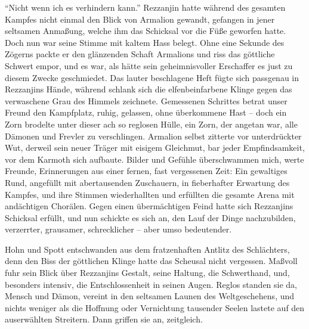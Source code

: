 ``Nicht wenn ich es verhindern kann.'' Rezzanjin hatte während des gesamten Kampfes nicht einmal den Blick von Armalion gewandt, gefangen in jener seltsamen Anmaßung, welche ihm das Schicksal vor die Füße geworfen hatte. Doch nun war seine Stimme mit kaltem Hass belegt. Ohne eine Sekunde des Zögerns packte er den glänzenden Schaft Armalions und riss das göttliche Schwert empor, und es war, als hätte sein geheimnisvoller Erschaffer es just zu diesem Zwecke geschmiedet. Das lauter beschlagene Heft fügte sich passgenau in Rezzanjins Hände, während schlank sich die elfenbeinfarbene Klinge gegen das verwaschene Grau des Himmels zeichnete. Gemessenen Schrittes betrat unser Freund den Kampfplatz, ruhig, gelassen, ohne überkommene Hast -- doch ein Zorn brodelte unter dieser ach so reglosen Hülle, ein Zorn, der angetan war, alle Dämonen und Frevler zu verschlingen. Armalion selbst zitterte vor unterdrückter Wut, derweil sein neuer Träger mit eisigem Gleichmut, bar jeder Empfindsamkeit, vor dem Karmoth sich aufbaute. Bilder und Gefühle überschwammen mich, werte Freunde, Erinnerungen aus einer fernen, fast vergessenen Zeit: Ein gewaltiges Rund, angefüllt mit abertausenden Zuschauern, in fieberhafter Erwartung des Kampfes, und ihre Stimmen wiederhallten und erfüllten die gesamte Arena mit andächtigen Chorälen. Gegen einen übermächtigen Feind hatte sich Rezzanjins Schicksal erfüllt, und nun schickte es sich an, den Lauf der Dinge nachzubilden, verzerrter, grausamer, schrecklicher -- aber umso bedeutender.

Hohn und Spott entschwanden aus dem fratzenhaften Antlitz des Schlächters, denn den Biss der göttlichen Klinge hatte das Scheusal nicht vergessen. Maßvoll fuhr sein Blick über Rezzanjins Gestalt, seine Haltung, die Schwerthand, und, besonders intensiv, die Entschlossenheit in seinen Augen. Reglos standen sie da, Mensch und Dämon, vereint in den seltsamen Launen des Weltgeschehens, und nichts weniger als die Hoffnung oder Vernichtung tausender Seelen lastete auf den auserwählten Streitern. Dann griffen sie an, zeitgleich.

